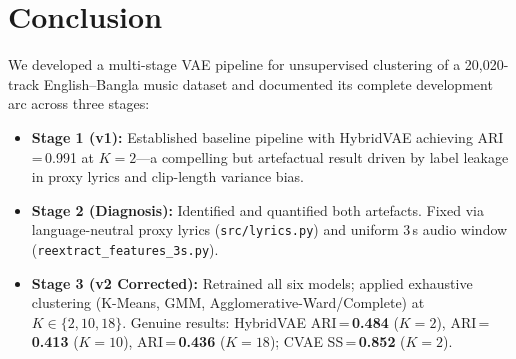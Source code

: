 \documentclass{article}
\begin{document}
\section{Conclusion}

We developed a multi-stage VAE pipeline for unsupervised clustering of a 20,020-track
English--Bangla music dataset and documented its complete development arc across three
stages:

\begin{itemize}
    \item \textbf{Stage 1 (v1):} Established baseline pipeline with HybridVAE achieving
          ARI\,=\,0.991 at $K\!=\!2$---a compelling but artefactual result driven by
          label leakage in proxy lyrics and clip-length variance bias.
    \item \textbf{Stage 2 (Diagnosis):} Identified and quantified both artefacts.
          Fixed via language-neutral proxy lyrics (\texttt{src/lyrics.py}) and uniform
          3\,s audio window (\texttt{reextract\_features\_3s.py}).
    \item \textbf{Stage 3 (v2 Corrected):} Retrained all six models; applied exhaustive
          clustering (K-Means, GMM, Agglomerative-Ward/Complete) at
          $K\!\in\!\{2,10,18\}$. Genuine results: HybridVAE ARI\,=\,\textbf{0.484}
          ($K\!=\!2$), ARI\,=\,\textbf{0.413} ($K\!=\!10$), ARI\,=\,\textbf{0.436}
          ($K\!=\!18$); CVAE SS\,=\,\textbf{0.852} ($K\!=\!2$).
\end{itemize}
\end{document}
